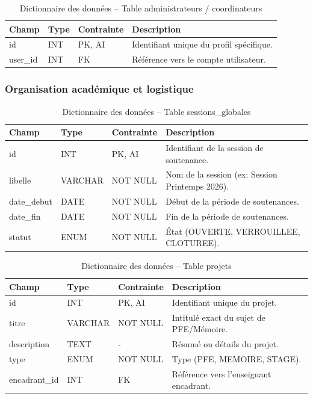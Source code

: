 \documentclass[12pt,a4paper]{article}
\begin{document}
\begin{table}[H]
    \centering
    \small
    \begin{tabular}{lp{2cm}lp{6cm}}
        \toprule
        \rowcolor{primary!10}
        \textbf{Champ} & \textbf{Type} & \textbf{Contrainte} & \textbf{Description} \\
        \midrule
        id & INT & PK, AI & Identifiant unique du profil spécifique. \\
        user\_id & INT & FK & Référence vers le compte utilisateur. \\
        \bottomrule
    \end{tabular}
    \caption{Dictionnaire des données -- Table administrateurs / coordinateurs}
\end{table}

\subsubsection{Organisation académique et logistique}

\begin{table}[H]
    \centering
    \small
    \begin{tabular}{lp{2cm}lp{6cm}}
        \toprule
        \rowcolor{primary!10}
        \textbf{Champ} & \textbf{Type} & \textbf{Contrainte} & \textbf{Description} \\
        \midrule
        id & INT & PK, AI & Identifiant de la session de soutenance. \\
        libelle & VARCHAR & NOT NULL & Nom de la session (ex: Session Printemps 2026). \\
        date\_debut & DATE & NOT NULL & Début de la période de soutenances. \\
        date\_fin & DATE & NOT NULL & Fin de la période de soutenances. \\
        statut & ENUM & NOT NULL & État (OUVERTE, VERROUILLEE, CLOTUREE). \\
        \bottomrule
    \end{tabular}
    \caption{Dictionnaire des données -- Table sessions\_globales}
\end{table}

\begin{table}[H]
    \centering
    \small
    \begin{tabular}{lp{2cm}lp{6cm}}
        \toprule
        \rowcolor{primary!10}
        \textbf{Champ} & \textbf{Type} & \textbf{Contrainte} & \textbf{Description} \\
        \midrule
        id & INT & PK, AI & Identifiant unique du projet. \\
        titre & VARCHAR & NOT NULL & Intitulé exact du sujet de PFE/Mémoire. \\
        description & TEXT & - & Résumé ou détails du projet. \\
        type & ENUM & NOT NULL & Type (PFE, MEMOIRE, STAGE). \\
        encadrant\_id & INT & FK & Référence vers l'enseignant encadrant. \\
        \bottomrule
    \end{tabular}
    \caption{Dictionnaire des données -- Table projets}
\end{table}
\end{document}
